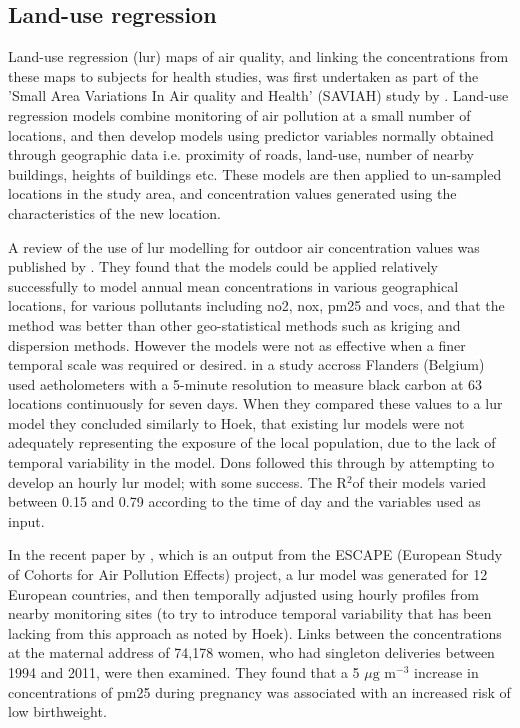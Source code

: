 
\subsection{Land-use regression}
\label{subsec:landuseregression}

Land-use regression (\gls{lur}) maps of air quality, and linking the concentrations from these maps to subjects for health studies, was first undertaken as part of the 'Small Area Variations In Air quality and Health' (SAVIAH) study by \cite{Briggs1997}. Land-use regression models combine monitoring of air pollution at a small number of locations, and then develop models using predictor variables normally obtained through geographic data i.e. proximity of roads, land-use, number of nearby buildings, heights of buildings etc. These models are then applied to un-sampled locations in the study area, and concentration values generated using the characteristics of the new location.

A review of the use of \gls{lur} modelling for outdoor air concentration values was published by \cite{Hoek2008}. They found that the models could be applied relatively successfully to model annual mean concentrations in various geographical locations, for various pollutants including \gls{no2}, \gls{nox}, \gls{pm25} and \gls{vocs}, and that the method was better than other geo-statistical methods such as kriging and dispersion methods. However the models were not as effective when a finer temporal scale was required or desired. \cite{Dons2013} in a study accross Flanders (Belgium) used aetholometers with a 5-minute resolution to measure black carbon at 63 locations continuously for seven days. When they compared these values to a \gls{lur} model they concluded similarly to Hoek, that existing \gls{lur} models were not adequately representing the exposure of the local population, due to the lack of temporal variability in the model. Dons followed this through by attempting to develop an hourly \gls{lur} model; with some success. The R$^{2}$of their models varied between 0.15 and 0.79 according to the time of day and the variables used as input.

In the recent paper by \cite{Pedersen2013}, which is an output from the ESCAPE (European Study of Cohorts for Air Pollution Effects) project, a \gls{lur} model was generated for 12 European countries, and then temporally adjusted using hourly profiles from nearby monitoring sites (to try to introduce temporal variability that has been lacking from this approach as noted by Hoek). Links between the concentrations at the maternal address of 74,178 women, who had singleton deliveries between 1994 and 2011, were then examined. They found that a 5 $\mu \text{g m}^{-3}$ increase in concentrations of \gls{pm25} during pregnancy was associated with an increased risk of low birthweight.\newline

